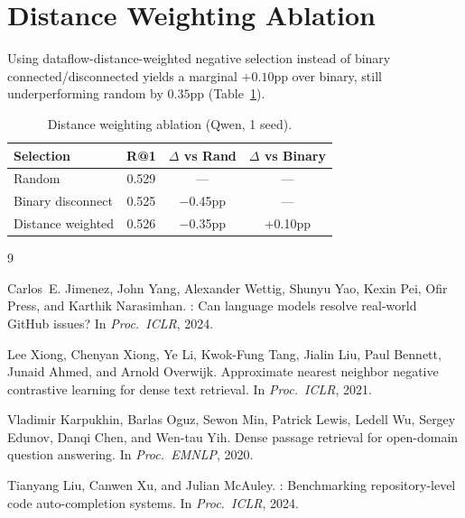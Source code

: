 \documentclass[11pt,a4paper]{article}
\begin{document}
\section{Distance Weighting Ablation}
\label{app:distance}

Using dataflow-distance-weighted negative selection instead of binary connected/disconnected yields a marginal $+0.10$pp over binary, still underperforming random by $0.35$pp (Table~\ref{tab:dist_weight}).

\begin{table}[h]
\centering
\caption{Distance weighting ablation (Qwen, 1 seed).}
\label{tab:dist_weight}
\small
\begin{tabular}{lccc}
\toprule
\textbf{Selection} & \textbf{R@1} & $\Delta$ \textbf{vs Rand} & $\Delta$ \textbf{vs Binary} \\
\midrule
Random & 0.529 & --- & --- \\
Binary disconnect & 0.525 & $-$0.45pp & --- \\
Distance weighted & 0.526 & $-$0.35pp & +0.10pp \\
\bottomrule
\end{tabular}
\end{table}

\begin{thebibliography}{9}

Carlos~E. Jimenez, John Yang, Alexander Wettig, Shunyu Yao, Kexin Pei, Ofir Press, and Karthik Narasimhan.
: Can language models resolve real-world {GitHub} issues?
\newblock In \emph{Proc.\ ICLR}, 2024.

Lee Xiong, Chenyan Xiong, Ye Li, Kwok-Fung Tang, Jialin Liu, Paul Bennett, Junaid Ahmed, and Arnold Overwijk.
\newblock Approximate nearest neighbor negative contrastive learning for dense text retrieval.
\newblock In \emph{Proc.\ ICLR}, 2021.

Vladimir Karpukhin, Barlas Oguz, Sewon Min, Patrick Lewis, Ledell Wu, Sergey Edunov, Danqi Chen, and Wen-tau Yih.
\newblock Dense passage retrieval for open-domain question answering.
\newblock In \emph{Proc.\ EMNLP}, 2020.

Tianyang Liu, Canwen Xu, and Julian McAuley.
: Benchmarking repository-level code auto-completion systems.
\newblock In \emph{Proc.\ ICLR}, 2024.

\end{thebibliography}
\end{document}
